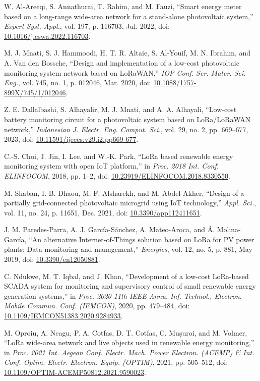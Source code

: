 \documentclass{ieeeaccess}
\begin{document}
\begin{thebibliography}{00}
W. Al-Areeqi, S. Annathurai, T. Rahim, and M. Fauzi, “Smart energy meter based on a long-range wide-area network for a stand-alone photovoltaic system,” \emph{Expert Syst. Appl.}, vol. 197, p. 116703, Jul. 2022, doi: \url{10.1016/j.eswa.2022.116703}.

M. J. Mnati, S. J. Hammoodi, H. T. R. Altaie, S. Al-Youif, M. N. Ibrahim, and A. Van den Bossche, “Design and implementation of a low-cost photovoltaic monitoring system network based on LoRaWAN,” \emph{IOP Conf. Ser. Mater. Sci. Eng.}, vol. 745, no. 1, p. 012046, Mar. 2020, doi: \url{10.1088/1757-899X/745/1/012046}.


Z. E. Dallalbashi, S. Alhayalir, M. J. Mnati, and A. A. Alhayali, “Low-cost battery monitoring circuit for a photovoltaic system based on LoRa/LoRaWAN network,” \emph{Indonesian J. Electr. Eng. Comput. Sci.}, vol. 29, no. 2, pp. 669–677, 2023, doi: \url{10.11591/ijeecs.v29.i2.pp669-677}.


C.-S. Choi, J. Jin, I. Lee, and W.-K. Park, “LoRa based renewable energy monitoring system with open IoT platform,” in \emph{Proc. 2018 Int. Conf. ELINFOCOM}, 2018, pp. 1–2, doi: \url{10.23919/ELINFOCOM.2018.8330550}.

M. Shaban, I. B. Dhaou, M. F. Alsharekh, and M. Abdel-Akher, “Design of a partially grid-connected photovoltaic microgrid using IoT technology,” \emph{Appl. Sci.}, vol. 11, no. 24, p. 11651, Dec. 2021, doi: \url{10.3390/app112411651}.


J. M. Paredes-Parra, A. J. García-Sánchez, A. Mateo-Aroca, and Á. Molina-García, “An alternative Internet-of-Things solution based on LoRa for PV power plants: Data monitoring and management,” \emph{Energies}, vol. 12, no. 5, p. 881, May 2019, doi: \url{10.3390/en12050881}.

C. Ndukwe, M. T. Iqbal, and J. Khan, “Development of a low-cost LoRa-based SCADA system for monitoring and supervisory control of small renewable energy generation systems,” in \emph{Proc. 2020 11th IEEE Annu. Inf. Technol., Electron. Mobile Commun. Conf. (IEMCON)}, 2020, pp. 479–484, doi: \url{10.1109/IEMCON51383.2020.9284933}.

M. Oproiu, A. Neagu, P. A. Cotfas, D. T. Cotfas, C. Mușuroi, and M. Volmer, “LoRa wide-area network and live objects used in renewable energy monitoring,” in \emph{Proc. 2021 Int. Aegean Conf. Electr. Mach. Power Electron. (ACEMP) \& Int. Conf. Optim. Electr. Electron. Equip. (OPTIM)}, 2021, pp. 505–512, doi: \url{10.1109/OPTIM-ACEMP50812.2021.9590023}.



\end{thebibliography}
\end{document}
